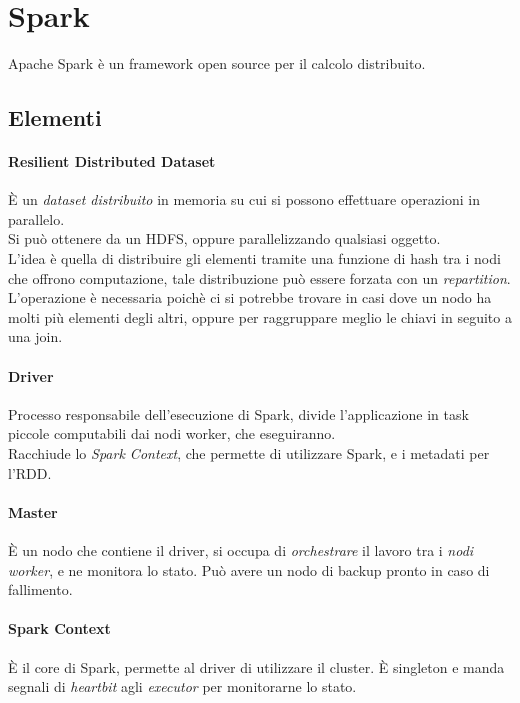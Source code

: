 \section{Spark}
Apache Spark è un framework open source per il calcolo distribuito.

\subsection{Elementi}
\paragraph{Resilient Distributed Dataset}
È un \emph{dataset distribuito} in memoria su cui si possono effettuare operazioni in parallelo.\\
Si può ottenere da un HDFS, oppure parallelizzando qualsiasi oggetto.\\
L'idea è quella di distribuire gli elementi tramite una funzione di hash tra i nodi 
che offrono computazione, tale distribuzione può essere forzata con un \emph{repartition}.\\
L'operazione è necessaria poichè ci si potrebbe trovare in casi dove un nodo ha molti più 
elementi degli altri, oppure per raggruppare meglio le chiavi in seguito a una join.

\paragraph{Driver}
Processo responsabile dell'esecuzione di Spark, divide l'applicazione in task piccole
computabili dai nodi worker, che eseguiranno.\\
Racchiude lo \emph{Spark Context}, che permette di utilizzare Spark, e i metadati per l'RDD.

\paragraph{Master}
È un nodo che contiene il driver, si occupa di \emph{orchestrare} il lavoro tra i \emph{nodi worker}, 
e ne monitora lo stato. Può avere un nodo di backup pronto in caso di fallimento.

\paragraph{Spark Context}
È il core di Spark, permette al driver di utilizzare il cluster. È singleton e manda segnali 
di \emph{heartbit} agli \emph{executor} per monitorarne lo stato.

